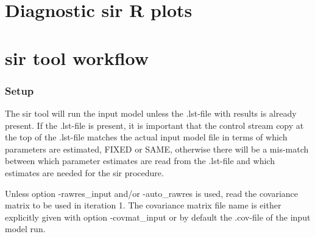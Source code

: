 \section{Diagnostic sir R plots}
\newcommand{\rplotsconditions}{
See section Output, subsections Basic and Extended diagnostic  R plots, for descriptions of the default sir R plots. The default sir template requires that R libraries gplots, ggplot2, dplyr, gridExtra, RColorBrewer, tidyr, MCMCpack and stats4 are installed. If the conditions are not fulfilled then no pdf will be generated, see the .Rout file in the main run directory for error messages.}



\section{sir tool workflow}
\subsubsection*{Setup}
The sir tool will run the input model unless the .lst-file with results is already present. If the .lst-file is present, it
is important that the control stream copy at the top of the .lst-file matches the actual input model file in terms of which parameters are estimated, FIXED or SAME, otherwise there will be a mis-match between which parameter estimates are read from the .lst-file and which estimates are needed for the sir procedure.

Unless option -rawres\_input and/or -auto\_rawres is used, read the covariance matrix to be used in iteration 1. The covariance matrix file name is either explicitly given with option -covmat\_input or by default the .cov-file of the input model run.

